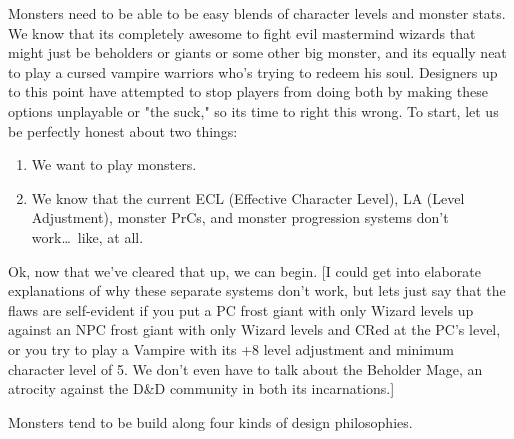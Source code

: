 Monsters need to be able to be easy blends of character levels and monster stats. We know that its completely awesome to fight evil mastermind wizards that might just be beholders or giants or some other big monster, and its equally neat to play a cursed vampire warriors who's trying to redeem his soul. Designers up to this point have attempted to stop players from doing both by making these options unplayable or "the suck," so its time to right this wrong. To start, let us be perfectly honest about two things:

\begin{enumerate}\itemspace
   \item We want to play monsters.
   \item We know that the current ECL (Effective Character Level), LA (Level Adjustment), monster PrCs, and monster progression systems don't work\ldots\  like, at all.
\end{enumerate}

Ok, now that we've cleared that up, we can begin. [I could get into elaborate explanations of why these separate systems don't work, but lets just say that the flaws are self-evident if you put a PC frost giant with only Wizard levels up against an NPC frost giant with only Wizard levels and CRed at the PC's level, or you try to play a Vampire with its +8 level adjustment and minimum character level of 5. We don't even have to talk about the Beholder Mage, an atrocity against the D\&D community in both its incarnations.]

Monsters tend to be build along four kinds of design philosophies.

